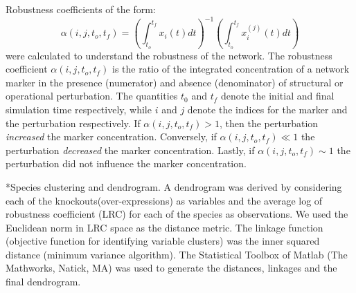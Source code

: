 \documentclass[12pt]{article}
\makeatletter
\renewcommand\subsection{\@startsection
	{subsection}{2}{0mm}
	{-0.05in}
	{-0.5\baselineskip}
	{\normalfont\normalsize\bfseries}}
\makeatother
\begin{document}
Robustness coefficients of the form:
\begin{equation}
\alpha\left(i,j,t_{o},t_{f}\right)=\left(\displaystyle\int_{t_{o}}^{t_{f}}x_{i}\left(t\right)dt\right)^{-1}\left(\displaystyle\int_{t_{o}}^{t_{f}}x^{(j)}_{i}\left(t\right)dt\right)
\end{equation}
were calculated to understand the robustness of the network. 
The robustness coefficient $\alpha\left(i,j,t_{o},t_{f}\right)$ is the ratio of the integrated concentration of a network marker 
in the presence (numerator) and absence (denominator) of structural or operational perturbation.
The quantities $t_0$ and $t_f$ denote the initial and final simulation time respectively, while
$i$ and $j$ denote the indices for the marker and the perturbation respectively. 
If $\alpha\left(i,j,t_{o},t_{f}\right)>1$, then the perturbation \emph{increased} the marker concentration. Conversely,
if $\alpha\left(i,j,t_{o},t_{f}\right)\ll{1}$ the perturbation \emph{decreased} the marker concentration. Lastly, if
$\alpha\left(i,j,t_{o},t_{f}\right)\sim{1}$ the perturbation did not influence the marker concentration.

\subsection*{Species clustering and dendrogram.}
A dendrogram was derived by considering each of the knockouts(over-expressions) as variables and the average log of robustness coefficient (LRC) for each of the species as observations. We used the Euclidean norm in LRC space as the distance metric. The linkage function (objective function for identifying variable clusters) was the inner squared distance (minimum variance algorithm). The Statistical Toolbox of Matlab (The Mathworks, Natick, MA) was used to generate the distances, linkages and the final dendrogram. 
\end{document}
